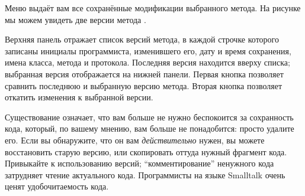 \documentclass[a4paper,10pt,twoside]{book}
\begin{document}

Меню  выдаёт вам все сохранённые модификации выбранного метода. На рисунке  мы можем увидеть две версии метода .


Верхняя панель отражает список версий метода, в каждой строчке которого записаны инициалы программиста, изменившего его, дату и время сохранения, имена класса, метода и протокола. Последняя версия находится вверху списка; выбранная версия отображается на нижней панели. Первая кнопка позволяет сравнить последнюю и выбранную версию метода. Вторая кнопка позволяет откатить изменения к выбранной версии.


Существование  означает, что вам больше не нужно беспокоится за сохранность кода, который, по вашему мнению, вам больше не понадобится: просто удалите его. Если вы обнаружите, что он вам \emph{действительно} нужен, вы можете восстановить старую версию, или скопировать оттуда нужный фрагмент кода. Привыкайте к использованию версий; ``комментирование'' ненужного кода затрудняет чтение актуального кода. Программисты на языке Smalltalk очень ценят удобочитаемость кода.
\end{document}
